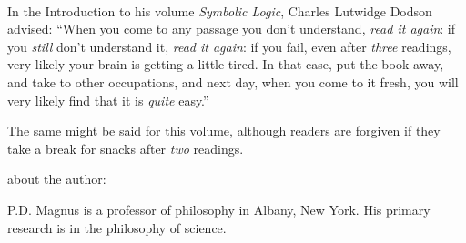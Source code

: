 \thispagestyle{empty}
\onecolumn
\ 
\vfill

\parbox{3 in}{
In the Introduction to his volume \emph{Symbolic Logic}, Charles Lutwidge Dodson advised: ``When you come to any passage you don't understand, \emph{read it again}: if you \emph{still} don't understand it, \emph{read it again}: if you fail, even after \emph{three} readings, very likely your brain is getting a little tired. In that case, put the book away, and take to other occupations, and next day, when you come to it fresh, you will very likely find that it is \emph{quite} easy.''

\medskip

The same might be said for this volume, although readers are forgiven if they take a break for snacks after \emph{two} readings.
}

\vfill

\parbox{3 in}{
{\sf about the author:}
\medskip

P.D. Magnus is a professor of philosophy in Albany, New York. His primary research is in the philosophy of science.
}
\vfill

